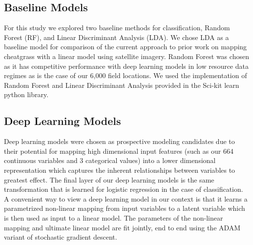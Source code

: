 \def\year{2017}\relax \documentclass[letterpaper]{article}
\begin{document}
\subsection{Baseline Models}
For this study we explored two baseline methods for classification, Random Forest (RF), and Linear Discriminant Analysis (LDA). 
We chose LDA as a baseline model for comparison of the current approach to prior work on mapping cheatgrass with a linear model using satellite imagery. Random Forest was chosen as it has competitive performance with deep learning models in low resource data regimes as is the case of our 6,000 field locations. We used the implementation of Random Forest and Linear Discriminant Analysis  provided in the Sci-kit learn python library.

\subsection{Deep Learning Models}
Deep learning models were chosen as prospective modeling candidates due to their potential for mapping high dimensional input features (such as our 664 continuous variables and 3 categorical values) into a lower dimensional representation which captures the inherent relationships between variables to greatest effect. The final layer of our deep learning models is the same transformation that is learned for logistic regression in the case of classification.
A convenient way to view a deep learning model in our context is that it learns a parametrized non-linear mapping from input variables to a latent variable which is then used as input to a linear model. The parameters of the non-linear mapping and ultimate linear model are fit jointly, end to end using the ADAM variant of stochastic gradient descent. 
\end{document}
